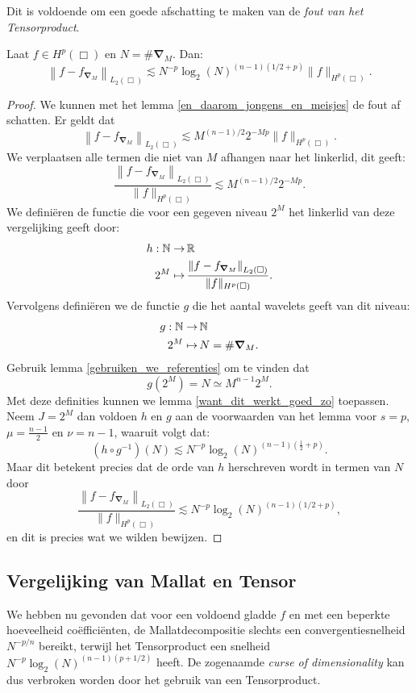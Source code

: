 Dit is voldoende om een goede afschatting te maken van de \emph{fout van het Tensorproduct}.
\begin{stelling}
\label{thm:fouttensor}
  Laat $f \in H^p(\Box)$ en $N = \#\boldsymbol{\nabla}_M$. Dan:
  \[
  \left\| f - f_{\boldsymbol\nabla_M} \right\|_{L_2(\Box)} \lesssim N^{-p} \log_2(N)^{(n-1)(1/2 + p)} \| f \|_{H^p(\Box)}.
  \]
\end{stelling}
\begin{proof}
  We kunnen met het lemma \ref{en_daarom_jongens_en_meisjes} de fout af schatten. Er geldt dat
  \[
  \left\| f - f_{\boldsymbol\nabla_M} \right\|_{L_2(\Box)} \lesssim M^{(n-1)/2}2^{-Mp}\| f \|_{H^p(\Box)}.
  \]
  We verplaatsen alle termen die niet van $M$ afhangen naar het linkerlid, dit geeft:
  \[
  \frac{\left\| f - f_{\boldsymbol\nabla_M}  \right\|_{L_2(\Box)}}{\| f \|_{H^p(\Box)}} \lesssim M^{(n-1)/2}2^{-Mp}.
  \]
  We defini\"eren de functie die voor een gegeven niveau $2^M$ 
  het linkerlid van deze vergelijking geeft door:
  \[
  \begin{split}
    h: \mathbb{N} \to&\, \mathbb{R} \\
    2^M \mapsto&\, \frac{\left\| f - f_{\boldsymbol\nabla_M}  \right\|_{L_2(\Box)}}{\| f \|_{H^p(\Box)}}.
  \end{split}
  \]
  Vervolgens defini\"eren we de functie $g$ die het aantal wavelets geeft van dit niveau:
  \[
  \begin{split}
    g: \mathbb{N} \to&\, \mathbb{N}\\
    2^M \mapsto&\, N = \#\boldsymbol{\nabla}_M.
  \end{split}
  \]
  Gebruik lemma \ref{gebruiken_we_referenties} om te vinden dat 
  \[
  g(2^M) = N \simeq M^{n-1}2^M.
  \]
  Met deze definities kunnen we lemma \ref{want_dit_werkt_goed_zo} toepassen. Neem $J=2^M$
  dan voldoen $h$ en $g$ aan de voorwaarden van het lemma voor $s=p$, $\mu=\tfrac{n-1}{2}$ en $\nu=n-1$,
  waaruit volgt dat:
  \[
    (h \circ g^{-1})(N) \lesssim N^{-p} \log_2(N)^{(n-1)\left(\tfrac12 + p\right)}. 
  \]
  Maar dit betekent precies dat de orde van $h$ herschreven wordt in termen van $N$ door
  \[
  \frac{\left\| f - f_{\boldsymbol\nabla_M} \right\|_{L_2(\Box)}}{\| f \|_{H^p(\Box)}}
  \lesssim N^{-p} \log_2(N)^{(n-1)(1/2 + p)}, 
  \]
  en dit is precies wat we wilden bewijzen.
\end{proof}

\subsection{Vergelijking van Mallat en Tensor}
We hebben nu gevonden dat voor een voldoend gladde $f$ en met een beperkte hoeveelheid co\"effici\"enten, 
de Mallatdecompositie slechts een convergentiesnelheid $N^{-p/n}$ bereikt, 
terwijl het Tensorproduct een snelheid $N^{-p} \log_2(N)^{(n-1)(p+1/2)}$ heeft. 
De zogenaamde \emph{curse of dimensionality} kan dus verbroken worden door het gebruik van een Tensorproduct.

